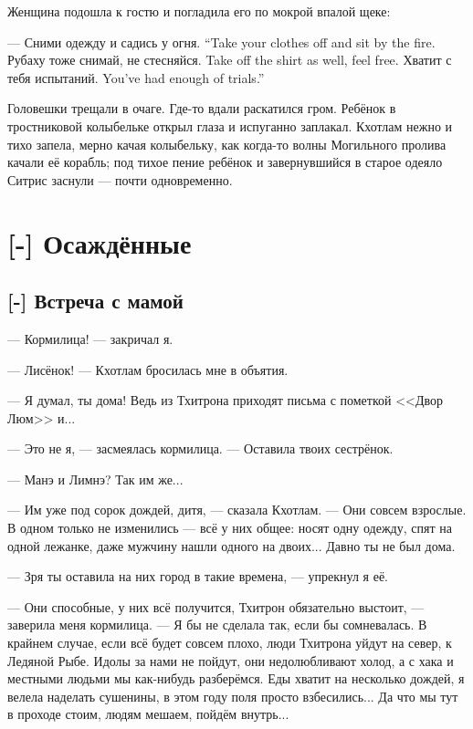 Женщина подошла к гостю и погладила его по мокрой впалой щеке:

{--- Сними одежду и садись у огня.}
{``Take your clothes off and sit by the fire.}
{Рубаху тоже снимай, не стесняйся.}
{Take off the shirt as well, feel free.}
{Хватит с тебя испытаний.}
{You've had enough of trials.''}

Головешки трещали в очаге.
Где-то вдали раскатился гром.
Ребёнок в тростниковой колыбельке открыл глаза и испуганно заплакал.
Кхотлам нежно и тихо запела, мерно качая колыбельку, как когда-то волны Могильного пролива качали её корабль;
под тихое пение ребёнок и завернувшийся в старое одеяло Ситрис заснули --- почти одновременно.

\chapter{[-] Осаждённые}

\section{[-] Встреча с мамой}

\textspace

--- Кормилица! --- закричал я.

--- Лисёнок! --- Кхотлам бросилась мне в объятия.

--- Я думал, ты дома!
Ведь из Тхитрона приходят письма с пометкой <<Двор Люм>> и...

--- Это не я, --- засмеялась кормилица.
--- Оставила твоих сестрёнок.

--- Манэ и Лимнэ?
Так им же...

--- Им уже под сорок дождей, дитя, --- сказала Кхотлам.
--- Они совсем взрослые.
В одном только не изменились --- всё у них общее: носят одну одежду, спят на одной лежанке, даже мужчину нашли одного на двоих...
Давно ты не был дома.

--- Зря ты оставила на них город в такие времена, --- упрекнул я её.

--- Они способные, у них всё получится, Тхитрон обязательно выстоит, --- заверила меня кормилица.
--- Я бы не сделала так, если бы сомневалась.
В крайнем случае, если всё будет совсем плохо, люди Тхитрона уйдут на север, к Ледяной Рыбе.
Идолы за нами не пойдут, они недолюбливают холод, а с хака и местными людьми мы как-нибудь разберёмся.
Еды хватит на несколько дождей, я велела наделать сушенины\FM, в этом году поля просто взбесились...
Да что мы тут в проходе стоим, людям мешаем, пойдём внутрь...

